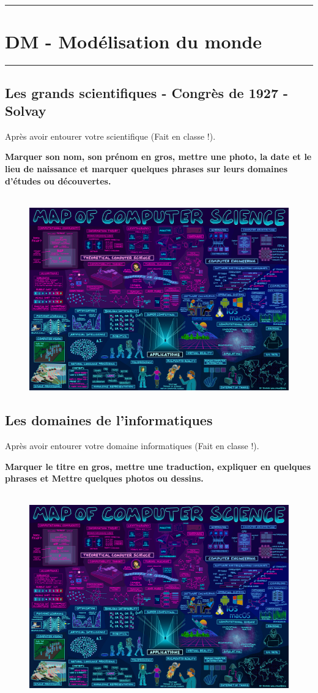 \documentclass[12pt]{article}
\newcommand{\horrule}[1]{\rule{\linewidth}{#1}} %
\begin{document}
\setlength{\columnseprule}{1pt}

\horrule{2px}
\section*{DM - Modélisation du monde}
\horrule{2px}
\vspace{-1cm}

\subsection*{Les grands scientifiques - Congrès de 1927 - Solvay}

Après avoir entourer votre scientifique (Fait en classe !). 

\textbf{Marquer son nom, son prénom en gros, mettre une photo, la date et le lieu de naissance et marquer quelques phrases sur leurs domaines d'études ou découvertes.}

    \begin{figure}[H]
        \centering
        \includegraphics[width=0.6\linewidth]{4x5-calcul-litteral-1/sources/compsci.png}
  \end{figure}


\subsection*{Les domaines de l'informatiques}

Après avoir entourer votre domaine informatiques (Fait en classe !). 

\textbf{Marquer le titre en gros, mettre une traduction, expliquer en quelques phrases et Mettre quelques photos ou dessins.}

    \begin{figure}[H]
        \centering
        \includegraphics[width=0.6\linewidth]{4x5-calcul-litteral-1/sources/compsci.png}
  \end{figure}
\end{document}
